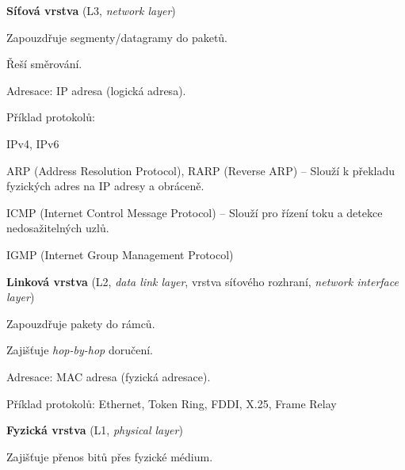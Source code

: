 \begin{compactitem}
    \item \textbf{Síťová vrstva} (L3, \textit{network layer}) \begin{compactitem}
        \item Zapouzdřuje segmenty/datagramy do paketů.
        \item Řeší směrování.
        \item Adresace: IP adresa (logická adresa).
        \item Příklad protokolů: \begin{compactitem}
            \item IPv4, IPv6
            \item ARP (Address Resolution Protocol), RARP (Reverse ARP) -- Slouží k překladu fyzických adres na IP adresy a obráceně.
            \item ICMP (Internet Control Message Protocol) -- Slouží pro řízení toku a detekce nedosažitelných uzlů.
            \item IGMP (Internet Group Management Protocol)
        \end{compactitem}
    \end{compactitem}

    \item \textbf{Linková vrstva} (L2, \textit{data link layer}, vrstva síťového rozhraní, \textit{network interface layer}) \begin{compactitem}
        \item Zapouzdřuje pakety do rámců.
        \item Zajišťuje \textit{hop-by-hop} doručení.
        \item Adresace: MAC adresa (fyzická adresace).
        \item Příklad protokolů: Ethernet, Token Ring, FDDI, X.25, Frame Relay
    \end{compactitem}

    \item \textbf{Fyzická vrstva} (L1, \textit{physical layer}) \begin{compactitem}
        \item Zajišťuje přenos bitů přes fyzické médium.
    \end{compactitem}
\end{compactitem}

